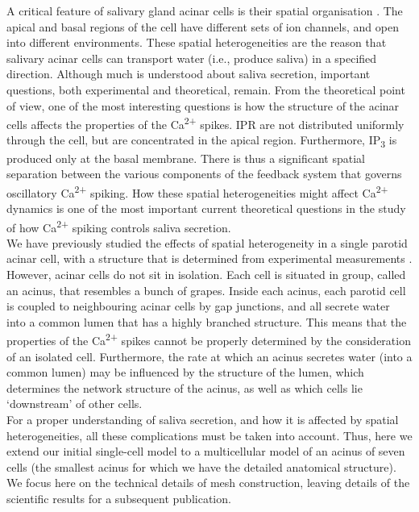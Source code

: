 \documentclass[10pt,letterpaper]{article}
\begin{document}
A critical feature of salivary gland acinar cells is their spatial organisation \cite{Sneyd2017383}. The apical and basal regions of the cell have different sets of ion channels, and open into different environments. These spatial heterogeneities are the reason that salivary acinar cells can transport water (i.e., produce saliva) in a specified direction.
Although much is understood about saliva secretion, important questions, both experimental and theoretical, remain. From the theoretical point of view, one of the most interesting questions is how the structure of the acinar cells affects the properties of the Ca\textsuperscript{2+} spikes. IPR are not distributed uniformly through the cell, but are concentrated in the apical region. Furthermore, IP\textsubscript{3} is produced only at the basal membrane. There is thus a significant spatial separation between the various components of the feedback system that governs oscillatory Ca\textsuperscript{2+} spiking. How these spatial heterogeneities might affect Ca\textsuperscript{2+} dynamics is one of the most important current theoretical questions in the study of how Ca\textsuperscript{2+} spiking controls saliva secretion.\\

We have previously studied the effects of spatial heterogeneity in a single parotid acinar cell, with a structure that is determined from experimental measurements \cite{sneyd2003}. However, acinar cells do not sit in isolation. Each cell is situated in group, called an acinus, that resembles a bunch of grapes. Inside each acinus, each parotid cell is coupled to neighbouring acinar cells by gap junctions, and all secrete water into a common lumen that has a highly branched structure. This means that the properties of the Ca\textsuperscript{2+} spikes cannot be properly determined by the consideration of an isolated cell. Furthermore, the rate at which an acinus secretes water (into a common lumen) may be influenced by the structure of the lumen, which determines the network structure of the acinus, as well as which cells lie `downstream' of other cells.\\

For a proper understanding of saliva secretion, and how it is affected by spatial heterogeneities, all these complications must be taken into account. Thus, here we extend our initial single-cell model to a multicellular model of an acinus of seven cells (the smallest acinus for which we have the detailed anatomical structure).
We focus here on the technical details of mesh construction, leaving details of the scientific results for a subsequent publication.\\
\end{document}

